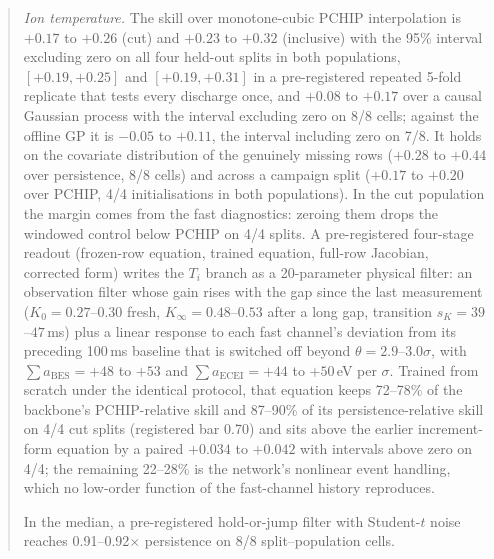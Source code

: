 \documentclass[10pt]{article}
\newcommand{\Ti}{\ensuremath{T_i}}
\begin{document}
\begin{abstract}
\emph{Ion temperature.} The skill over monotone-cubic PCHIP interpolation is $+0.17$
to $+0.26$ (cut) and $+0.23$ to $+0.32$ (inclusive) with the 95\% interval excluding
zero on all four held-out splits in both populations, $[+0.19, +0.25]$ and
$[+0.19, +0.31]$ in a pre-registered repeated 5-fold replicate that tests every
discharge once, and $+0.08$ to $+0.17$ over a causal Gaussian process with the
interval excluding zero on 8/8 cells; against the offline GP it is $-0.05$ to $+0.11$,
the interval including zero on 7/8. It holds on the covariate distribution of the
genuinely missing rows ($+0.28$ to $+0.44$ over persistence, 8/8 cells) and across a
campaign split ($+0.17$ to $+0.20$ over PCHIP, 4/4 initialisations in both
populations). In the cut population the margin comes from the fast diagnostics:
zeroing them drops the windowed control below PCHIP on 4/4 splits. A pre-registered
four-stage readout (frozen-row equation, trained
equation, full-row Jacobian, corrected form) writes the \Ti{} branch as a
20-parameter physical filter: an observation filter whose gain rises with the gap
since the last measurement ($K_0 = 0.27$--$0.30$ fresh, $K_\infty = 0.48$--$0.53$
after a long gap, transition $s_K = 39$--$47$\,ms) plus a linear response to each fast
channel's deviation from its preceding 100\,ms baseline that is switched off beyond
$\theta = 2.9$--$3.0\sigma$, with $\sum a_{\mathrm{BES}} = +48$ to $+53$ and
$\sum a_{\mathrm{ECEI}} = +44$ to $+50$\,eV per $\sigma$. Trained from scratch under
the identical protocol, that equation keeps 72--78\% of the backbone's PCHIP-relative
skill and 87--90\% of its persistence-relative skill on 4/4 cut splits (registered
bar 0.70) and sits above the earlier increment-form equation by a paired $+0.034$ to
$+0.042$ with intervals above zero on 4/4; the remaining 22--28\% is the network's
nonlinear event handling, which no low-order function of the fast-channel history
reproduces.

In the median, a pre-registered hold-or-jump filter with Student-$t$ noise reaches
0.91--0.92$\times$ persistence on 8/8 split--population cells.


\end{abstract}
\end{document}
